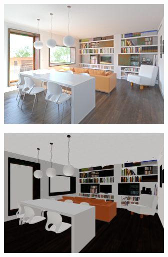 \begin{figure}[H]
\begin{subfigure}{0.32\linewidth}
        \includegraphics[width=\linewidth]{praca/images/AI45_002_Cam01.png}
    \end{subfigure}
    \begin{subfigure}{0.32\linewidth}
        \includegraphics[width=\linewidth]{praca/images/AI45_002_Cam01.direct_sengputa.png}
    \end{subfigure}
    \begin{subfigure}{0.32\linewidth}

\end{subfigure}
\end{figure}
